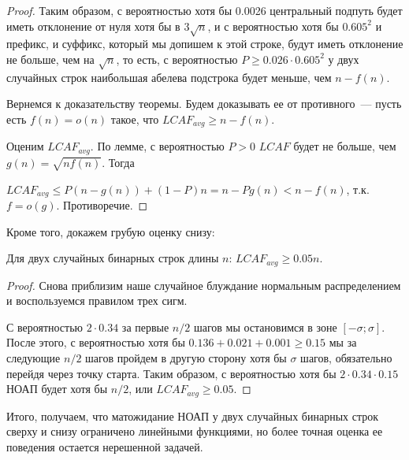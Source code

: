 \begin{proof}
Таким образом, с вероятностью хотя бы 0.0026 центральный подпуть будет иметь отклонение от нуля хотя бы в $3\sqrt n$, и с вероятностью хотя бы $0.605^2$ и префикс, и суффикс, который мы допишем к этой строке, будут иметь отклонение не больше, чем на $\sqrt n$, то есть, с вероятностью $P \ge 0.026 \cdot 0.605^2$ у двух случайных строк наибольшая абелева подстрока будет меньше, чем $n-f(n)$.

Вернемся к доказательству теоремы. Будем доказывать ее от противного~--- пусть есть $f(n)=o(n)$ такое, что $LCAF_{avg} \ge n - f(n)$. 

Оценим $LCAF_{avg}$. По лемме, с вероятностью $P>0$ $LCAF$ будет не больше, чем $g(n)=\sqrt{nf(n)}$. Тогда

$LCAF_{avg} \le P (n-g(n)) + (1-P)n = n-Pg(n) < n - f(n)$, т.к. $f=o(g)$. Противоречие.

\end{proof}

Кроме того, докажем грубую оценку снизу:
\begin{theorem}
Для двух случайных бинарных строк длины $n$: $LCAF_{avg} \ge 0.05n$.
\end{theorem}
\begin{proof}
Снова приблизим наше случайное блуждание нормальным распределением и воспользуемся правилом трех сигм.

С вероятностью $2 \cdot 0.34$ за первые $n/2$ шагов мы остановимся в зоне $[-\sigma; \sigma]$. После этого, с вероятностью хотя бы $0.136+0.021+0.001 \ge 0.15$ мы за следующие $n/2$ шагов пройдем в другую сторону хотя бы $\sigma$ шагов, обязательно перейдя через точку старта. Таким образом, с вероятностью хотя бы $2 \cdot 0.34 \cdot 0.15$ НОАП будет хотя бы $n/2$, или $LCAF_{avg} \ge 0.05$. %

\end{proof}

Итого, получаем, что матожидание НОАП у двух случайных бинарных строк сверху и снизу ограничено линейными функциями, но более точная оценка ее поведения остается нерешенной задачей.


